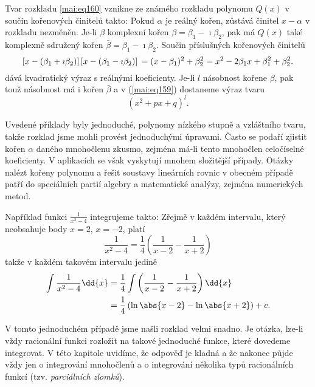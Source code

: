       Tvar rozkladu \ref{mai:eq160} vznikne ze známého rozkladu polynomu \(Q(x)\) v součin
      kořenových činitelů takto: Pokud \(\alpha\) je reálný kořen, zůstává činitel \(x-\alpha\) v
      rozkladu nezměněn. Je-li \(\beta\) komplexní kořen \(\beta = \beta_1-\imath\beta_2\), pak má
      \(Q(x)\) také komplexně sdružený kořen \(\bar{\beta} = \beta_1-\imath\beta_2\). Součin
      příslušných kořenových činitelů
      \begin{equation}\label{mai:eq161}
        \left[x-(\beta_1+\imath\beta_2)\right]  
        \left[x-(\beta_1-\imath\beta_2)\right]                             \nonumber \\
        = (x-\beta_1)^2+\beta^2_2 = x^2-2\beta_1x + \beta^2_1+\beta^2_2. 
      \end{equation}
      dává kvadratický výraz s reálnými koeficienty. Je-li \(l\) násobnost kořene \(\beta\), pak
      touž násobnost má i kořen \(\bar{\beta}\) a v (\ref{mai:eq159}) dostaneme výraz tvaru
      \begin{equation*}
        (x^2+px+q)^l.
      \end{equation*}

      Uvedené příklady byly jednoduché, polynomy nízkého stupně a vzláštního tvaru, takže rozklad
      jsme mohli provést jednoduchými úpravami. Často se podaří zjistit kořen \(\alpha\) daného
      mnohočlenu zkusmo, zejména má-li tento mnohočlen celočíselné koeficienty. V aplikacích se však
      vyskytují mnohem složitější případy. Otázky nalézt kořeny polynomu a řešit soustavy lineárních
      rovnic v obecném případě patří do speciálních partií algebry a matematické analýzy, zejména
      numerických metod.
      
      Například funkci \(\frac{1}{x^2-4}\) integrujeme takto: Zřejmě v každém intervalu, který
      neobsahuje body \(x=2\), \(x=-2\), platí
      \begin{equation*}
        \dfrac{1}{x^2-4} = \dfrac{1}{4}\left(\dfrac{1}{x-2} - \dfrac{1}{x+2}\right)
      \end{equation*}
      takže v každém takovém intervalu jedině
      \begin{align*}
        \int\dfrac{1}{x^2-4}\dd{x}  
          &= \dfrac{1}{4}\int\left(\dfrac{1}{x-2} - \dfrac{1}{x+2}\right)\dd{x}             \\
          &= \dfrac{1}{4}\left(\ln\abs{x-2} - \ln\abs{x+2}\right) + c.        
      \end{align*}

      V tomto jednoduchém případě jsme našli rozklad velmi snadno. Je otázka, lze-li vždy racionální
      funkci rozložit na takové jednoduché funkce, které dovedeme integrovat. V této kapitole
      uvidíme, že odpověď je kladná a že nakonec půjde vždy jen o integrování mnohočlenů a o
      integrování několika typů racionálních funkcí (tzv. \emph{parciálních zlomků}). 

